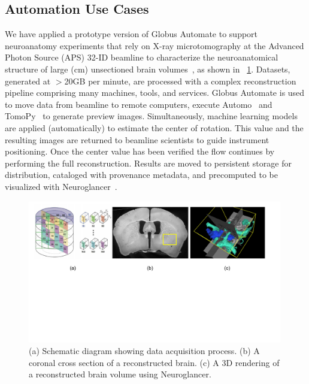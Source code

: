\documentclass{aip-cp}
\newcommand\kyle[1]{}
\newcommand\kyle[1]{{\color{purple}[Kyle: #1]}}
\begin{document}
\subsection{Automation Use Cases}

We have applied a prototype version of Globus Automate
to support neuroanatomy experiments that rely on
X-ray microtomography at the Advanced Photon Source (APS) 32-ID beamline to
characterize the neuroanatomical structure of large (cm) unsectioned brain 
volumes~\cite{kasthuri2015saturated}, as shown in \figurename{~\ref{fig:brains}}. 
Datasets, generated at $>$20GB per minute, are processed
with a complex reconstruction pipeline 
comprising many machines, tools, and services.  
Globus Automate is used to move data from beamline to remote computers,
execute Automo~\cite{Automo} and TomoPy~\cite{gursoy2014tomopy} 
to generate preview images. Simultaneously, machine learning models
are applied (automatically) to estimate the center of rotation. This value and the resulting 
images are returned to beamline scientists to guide instrument positioning. Once the center value 
has been verified the flow continues by performing the full reconstruction. Results are moved to 
persistent storage for distribution, cataloged with
provenance metadata, and precomputed to be visualized with Neuroglancer~\cite{Neuroglancer}. 

\begin{figure}[t!]
	\centering
	\includegraphics[trim={0 7cm 0 0},clip,width=0.99\textwidth]{Figs/brains.pdf}
	\caption{(a) Schematic diagram showing data acquisition process. 
	(b) A coronal cross section of a reconstructed brain.
	(c) A 3D rendering of a reconstructed brain volume using Neuroglancer.}
	\label{fig:brains}
\end{figure}
\end{document}
